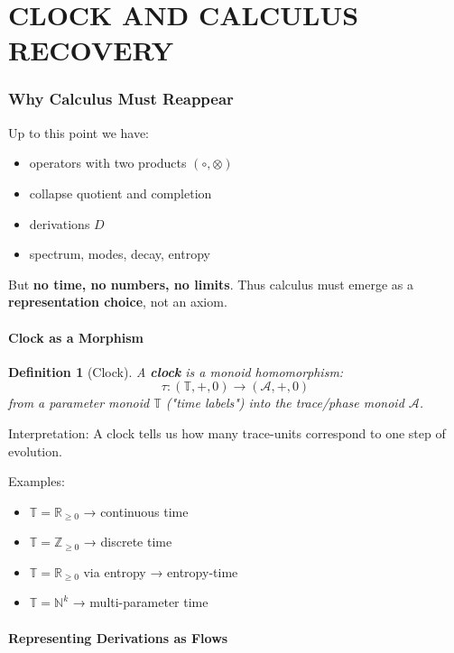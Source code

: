 \documentclass[12pt, oneside]{article}
\newtheorem{definition}[theorem]{Definition}
\newcommand{\A}{\mathcal{A}}
\begin{document}
\newpage

\part{CLOCK AND CALCULUS RECOVERY}

\section{Why Calculus Must Reappear}

Up to this point we have:
\begin{itemize}
    \item operators with two products $(\circ, \otimes)$
    \item collapse quotient and completion
    \item derivations $D$
    \item spectrum, modes, decay, entropy
\end{itemize}
But \textbf{no time, no numbers, no limits}. Thus calculus must emerge as a \textbf{representation choice}, not an axiom.

\subsection{Clock as a Morphism}

\begin{definition}[Clock]
A \textbf{clock} is a monoid homomorphism:
\begin{equation}
\tau: (\mathbb{T}, +, 0) \rightarrow (\A, +, 0)
\end{equation}
from a parameter monoid $\mathbb{T}$ ("time labels") into the trace/phase monoid $\A$.
\end{definition}

Interpretation: A clock tells us how many trace-units correspond to one step of evolution.

Examples:
\begin{itemize}
    \item $\mathbb{T} = \mathbb{R}_{\geq 0}$ → continuous time
    \item $\mathbb{T} = \mathbb{Z}_{\geq 0}$ → discrete time
    \item $\mathbb{T} = \mathbb{R}_{\geq 0}$ via entropy → entropy-time
    \item $\mathbb{T} = \mathbb{N}^k$ → multi-parameter time
\end{itemize}

\subsection{Representing Derivations as Flows}
\end{document}
